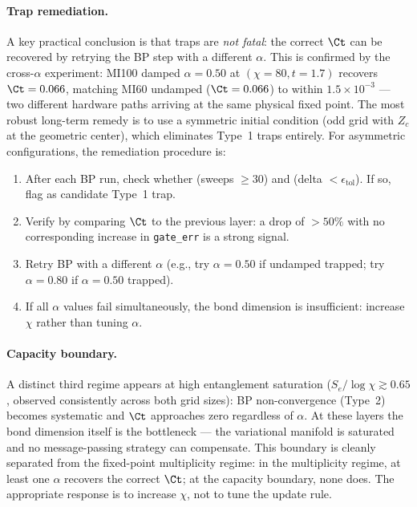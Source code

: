 \paragraph{Trap remediation.}
A key practical conclusion is that traps are \emph{not fatal}: the correct
$\Ct$ can be recovered by retrying the BP step with a different $\alpha$.
This is confirmed by the cross-$\alpha$ experiment: MI100 damped $\alpha=0.50$
at $(\chi=80, t=1.7)$ recovers $\Ct = 0.066$, matching MI60 undamped
($\Ct = 0.066$) to within $1.5\times10^{-3}$ --- two different hardware paths
arriving at the same physical fixed point.
The most robust long-term remedy is to use a symmetric initial condition
(odd grid with $Z_c$ at the geometric center), which eliminates Type~1 traps
entirely.
For asymmetric configurations, the remediation procedure is:
\begin{enumerate}
  \item After each BP run, check whether (sweeps $\geq 30$) and
        (delta $< \epsilon_{\mathrm{tol}}$).
        If so, flag as candidate Type~1 trap.
  \item Verify by comparing $\Ct$ to the previous layer: a drop of $>50\%$
        with no corresponding increase in \texttt{gate\_err} is a strong signal.
  \item Retry BP with a different $\alpha$ (e.g., try $\alpha=0.50$ if
        undamped trapped; try $\alpha=0.80$ if $\alpha=0.50$ trapped).
  \item If all $\alpha$ values fail simultaneously, the bond dimension is
        insufficient: increase $\chi$ rather than tuning $\alpha$.
\end{enumerate}

\paragraph{Capacity boundary.}
A distinct third regime appears at high entanglement saturation
($S_e/\log\chi \gtrsim 0.65$, observed consistently across both grid sizes):
BP non-convergence (Type~2) becomes systematic and $\Ct$ approaches zero
regardless of $\alpha$.
At these layers the bond dimension itself is the bottleneck --- the variational
manifold is saturated and no message-passing strategy can compensate.
This boundary is cleanly separated from the fixed-point multiplicity regime:
in the multiplicity regime, at least one $\alpha$ recovers the correct $\Ct$;
at the capacity boundary, none does.
The appropriate response is to increase $\chi$, not to tune the update rule.

